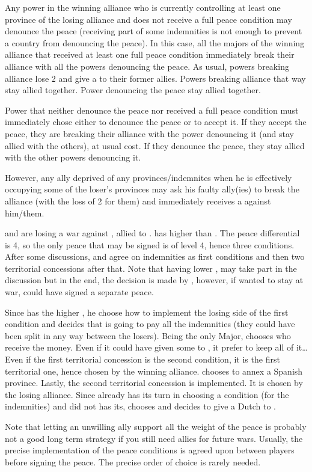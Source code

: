 \aparag[Disagreement] Any power in the winning alliance who is currently
controlling at least one province of the losing alliance and does not receive
a full peace condition may denounce the peace (receiving part of some
indemnities is not enough to prevent a country from denouncing the peace).
\bparag In this case, all the majors of the winning alliance that received at
least one full peace condition immediately break their alliance with all the
powers denouncing the peace.
\bparag As usual, powers breaking alliance lose 2 \STAB and give a \CB to
their former allies.
\bparag Powers breaking alliance that way stay allied together. Power
denouncing the peace stay allied together.

\aparag Power that neither denounce the peace nor received a full peace
condition must immediately chose either to denounce the peace or to accept
it.
\bparag If they accept the peace, they are breaking their alliance with the
power denouncing it (and stay allied with the others), at usual cost.
\bparag If they denounce the peace, they stay allied with the other powers
denouncing it.

However, any ally deprived of any provinces/indemnites
when he is effectively occupying some of the loser's provinces may ask his
faulty ally(ies) to break the alliance (with the loss of 2 \STAB for them) and
immediately receives a \CB against him/them.

\begin{exemple}[Disagreement]
  \HIS and \HOL are losing a war against \FRA, allied to \paysPortugal. \HOL
  has higher \DIP than \HIS. The peace differential is 4, so the only peace
  that may be signed is of level 4, hence three conditions. After some
  discussions, \FRA and \HOL agree on indemnities as first conditions and then
  two territorial concessions after that. Note that having lower \DIP, \HIS
  may take part in the discussion but in the end, the decision is made by
  \HOL, however, if \HOL wanted to stay at war, \HIS could have signed a
  separate peace.

  Since \HOL has the higher \DIP, he choose how to implement the losing side
  of the first condition and decides that \HIS is going to pay all the
  indemnities (they could have been split in any way between the
  losers). Being the only Major, \FRA chooses who receive the money. Even if
  it could have given some to \paysPortugal, it prefer to keep all of it\ldots
  Even if the first territorial concession is the second condition, it is the
  first territorial one, hence chosen by the winning alliance. \FRA chooses to
  annex a Spanish province. Lastly, the second territorial concession is
  implemented. It is chosen by the losing alliance. Since \HOL already has its
  turn in choosing a condition (for the indemnities) and \HIS did not has its,
  \HIS chooses and decides to give a Dutch \COL to \paysPortugal.

  Note that letting an unwilling ally support all the weight of the peace is
  probably not a good long term strategy if you still need allies for future
  wars. Usually, the precise implementation of the peace conditions is agreed
  upon between players before signing the peace. The precise order of choice
  is rarely needed.
\end{exemple}

